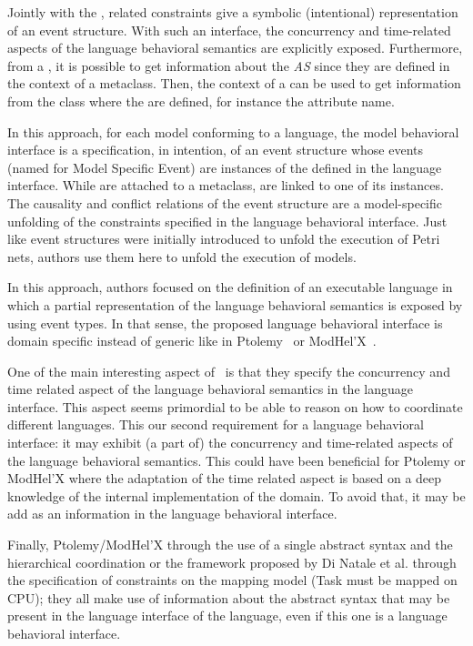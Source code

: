 Jointly with the \dse, related constraints give a symbolic (intentional) representation of an event structure. With such an interface, the concurrency and time-related aspects of the language behavioral semantics are explicitly exposed.
%
Furthermore, from a \dse, it is possible to get information about the \emph{AS} since they are defined in the context of a metaclass. Then, the context of a \dse can be used to get information from the class where the \dse are defined, for instance the attribute name.   

In this approach, for each model conforming to a language, the model behavioral interface is a specification, in intention, of an event structure whose events (named \mse for Model Specific Event) are instances of the \dse defined in the language interface. While \dse are attached to a metaclass, \mse are linked to one of its instances. The causality and conflict relations of the event structure are a model-specific unfolding of the constraints specified in the language behavioral interface. Just like event structures were initially introduced to unfold the execution of Petri nets, authors use them here to unfold the execution of models. 

In this approach, authors focused on the definition of an executable language in which a partial representation of the language behavioral semantics is exposed by using event types. In that sense, the proposed language behavioral interface is domain specific instead of generic like in Ptolemy~\cite{ptoleframebib} or ModHel'X~\cite{modhelxbib}. 

One of the main interesting aspect of~\cite{sle13-combemale} is that they specify the concurrency and time related aspect of the language behavioral semantics in the language interface.
This aspect seems primordial to be able to reason on how to coordinate different languages.
This our second requirement for a language behavioral interface: it may exhibit (a part of) the concurrency and time-related aspects of the language behavioral semantics. This could have been beneficial for Ptolemy or ModHel'X where the adaptation of the time related aspect is based on a deep knowledge of the internal implementation of the domain. To avoid that, it may be add as an information in the language behavioral interface.

Finally, Ptolemy/ModHel'X through the use of a single abstract syntax and the hierarchical coordination or the framework proposed by Di Natale et al. through the specification of constraints on the mapping model (\eg Task must be mapped on CPU); they all make use of information about the abstract syntax that may be present in the language interface of the language, even if this one is a language behavioral interface.

